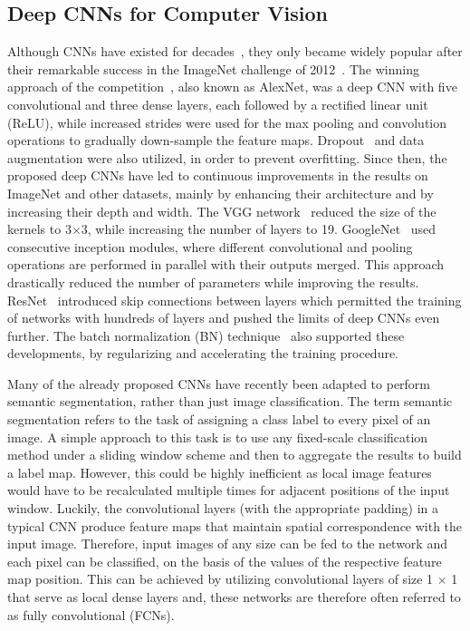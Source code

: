 \documentclass[journal]{IEEEtran}
\begin{document}
\subsection{Deep CNNs for Computer Vision}%
Although CNNs have existed for decades~\cite{lecun98}, they only became widely popular after their remarkable success in the ImageNet challenge of 2012~\cite{ILSVRC15}. The winning approach of the competition~\cite{krizhevsky2012imagenet}, also known as AlexNet, was a deep CNN with five convolutional and three dense layers, each followed by a rectified linear unit (ReLU), while increased strides were used for the max pooling and convolution operations to gradually down-sample the feature maps. Dropout~\cite{Dropout} and data augmentation were also utilized, in order to prevent overfitting. Since then, the proposed deep CNNs have led to continuous improvements in the results on ImageNet and other datasets, mainly by enhancing their architecture and by increasing their depth and width. The VGG network~\cite{simonyan2014very} reduced the size of the kernels to 3$\times$3, while increasing the number of layers to 19. GoogleNet~\cite{szegedy2015going} used consecutive inception modules, where different convolutional and pooling operations are performed in parallel with their outputs merged. This approach drastically reduced the number of parameters while improving the results. ResNet~\cite{he2016deep} introduced skip connections between layers which permitted the training of networks with hundreds of layers and pushed the limits of deep CNNs even further. The batch normalization (BN) technique~\cite{IoffeBN} also supported these developments, by regularizing and accelerating the training procedure.

Many of the already proposed CNNs have recently been adapted to perform semantic segmentation, rather than just image classification. The term semantic segmentation refers to the task of assigning a class label to every pixel of an image. A simple approach to this task is to use any fixed-scale classification method under a sliding window scheme and then to aggregate the results to build a label map. However, this could be highly inefficient as local image features would have to be recalculated multiple times for adjacent positions of the input window. Luckily, the convolutional layers (with the appropriate padding) in a typical CNN produce feature maps that maintain spatial correspondence with the input image. Therefore, input images of any size can be fed to the network and each pixel can be classified, on the basis of the values of the respective feature map position. This can be achieved by utilizing convolutional layers of size 1 $\times$ 1 that serve as local dense layers and, these networks are therefore often referred to as fully convolutional (FCNs). 
\end{document}
